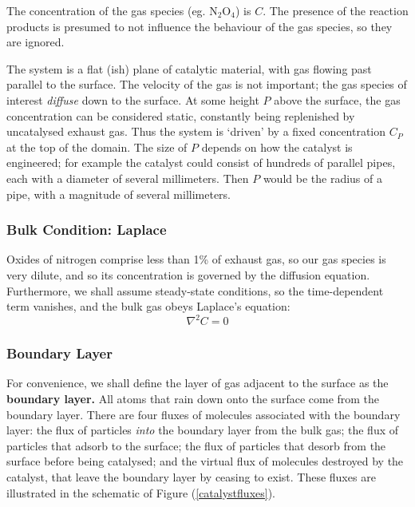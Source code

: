 \documentclass[12pt, a4paper, twoside, openright]{book}
\begin{document}
The concentration of the gas species (eg. N$_2$O$_4$) is $C$.  The presence of the reaction products is presumed to not influence the behaviour of the gas species, so they are ignored.
\vspace*{1em}

The system is a flat (ish) plane of catalytic material, with gas flowing past parallel to the surface.  The velocity of the gas is not important; the gas species of interest \emph{diffuse} down to the surface.  At some height $P$ above the surface, the gas concentration can be considered static, constantly being replenished by uncatalysed exhaust gas.  Thus the system is `driven' by a fixed concentration $C_P$ at the top of the domain.  The size of $P$ depends on how the catalyst is engineered; for example the catalyst could consist of hundreds of parallel pipes, each with a diameter of several millimeters.  Then $P$ would be the radius of a pipe, with a magnitude of several millimeters.



\subsubsection{Bulk Condition: Laplace}

Oxides of nitrogen comprise less than 1\% of exhaust gas, so our gas species is very dilute, and so its concentration is governed by the diffusion equation.  Furthermore, we shall assume steady-state conditions, so the time-dependent term vanishes, and the bulk gas obeys Laplace's equation:
\begin{equation}
\nabla^2 C = 0
\end{equation}


\subsubsection{Boundary Layer}

For convenience, we shall define the layer of gas adjacent to the surface as the \textbf{boundary layer.}  All atoms that rain down onto the surface come from the boundary layer. There are four fluxes of molecules associated with the boundary layer: the flux of particles \emph{into} the boundary layer from the bulk gas; the flux of particles that adsorb to the surface; the flux of particles that desorb from the surface before being catalysed; and the virtual flux of molecules destroyed by the catalyst, that leave the boundary layer by ceasing to exist. These fluxes are illustrated in the schematic of Figure (\ref{catalystfluxes}).
\end{document}
